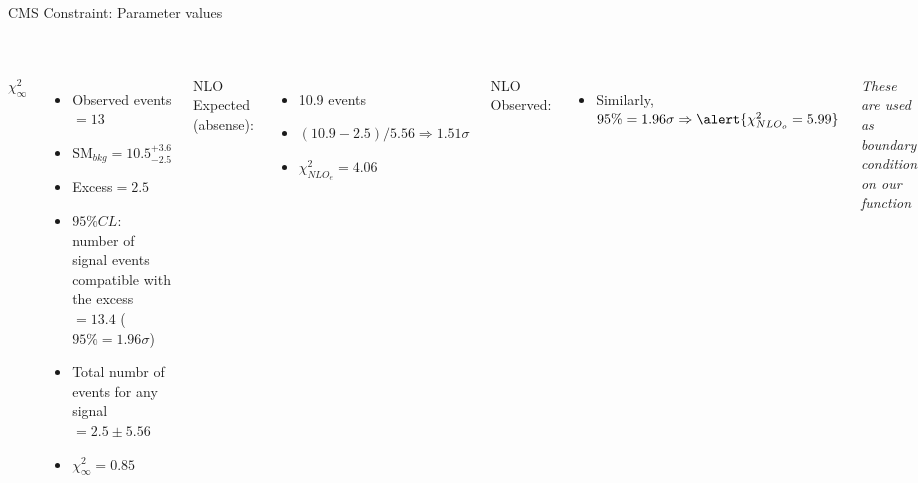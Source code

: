 \documentclass{beamer}
\begin{document}
\begin{frame}{CMS Constraint: Parameter values}
\section{\insertframetitle}
\begin{columns}[t]
  \column{2.0in}
$\chi^{2}_{\infty}$
  \begin{itemize}
    \item Observed events $= 13$
    \item $\textrm{SM}_{bkg}=10.5^{+3.6}_{-2.5}$
    \item Excess$ = 2.5$
    \item $95\% CL$: number of signal events compatible with the
    excess $ = 13.4$ ($95\%=1.96\sigma$)
    \item Total numbr of events for any signal $=2.5\pm5.56$
    \item \emph{$\chi^{2}_{\infty}=0.85$}
  \end{itemize}
  \column{2.0in}
  NLO Expected (absense):
  \begin{itemize}
    \item 10.9 events
    \item $(10.9-2.5)/5.56\Rightarrow 1.51\sigma$
    \item \emph{$\chi^{2}_{NLO_{e}} = 4.06$}
  \end{itemize}
  NLO Observed:
  \begin{itemize}
    \item Similarly, $95\%=1.96\sigma\Rightarrow\alert{\chi^{2}_{NLO_{o}}=
    5.99}$ 
  \end{itemize}
  \it{These are used as boundary condition on our function}

\end{columns}
\end{frame}
\end{document}

